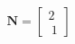 \documentclass[preview]{standalone}
\begin{document}
\begin{align*}
\mathbf{N} = \begin{bmatrix} 2  \\ \ 1 \end{bmatrix}
\end{align*}
\end{document}
